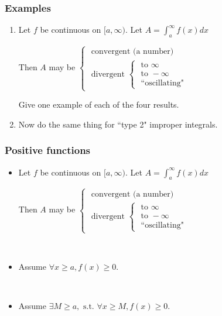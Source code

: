 \documentclass[14pt]{beamer}
\begin{document}
\begin{frame}[t]
	\frametitle{Examples}

	\begin{enumerate}
		\item Let $f$ be continuous on $[a, \infty)$. Let
			$\displaystyle A = \int_{a}^{\infty}f(x) dx$

			Then $A$ may be $\displaystyle
			\begin{cases}
				\text{ convergent (a number) }                                                                                  \\
				\text{ divergent } \begin{cases}\text{ to } \infty \\ \text{ to } - \infty \\ \text{ ``oscillating"}\end{cases}
			\end{cases}$

			Give one example of each of the four results.
			\vfill

		\item Now do the same thing for ``type 2" improper integrals.
	\end{enumerate}
	\vfill
\end{frame}

\begin{frame}[t]
	\fontsize{13}{13}\selectfont
	\frametitle{Positive functions}

	\begin{itemize}
		\item Let $f$ be continuous on $[a, \infty)$. Let
			$\displaystyle A = \int_{a}^{\infty}f(x) dx$

			Then $A$ may be $\displaystyle
			\begin{cases}
				\text{ convergent (a number) }                                                                                  \\
				\text{ divergent } \begin{cases}\text{ to } \infty \\ \text{ to } - \infty \\ \text{ ``oscillating"}\end{cases}
			\end{cases}$

			\

		\item Assume $\displaystyle \forall x \geq a, f(x) \geq 0$.
			\vspace{.2cm}


			\

		\item Assume $\displaystyle \exists M \geq a, \text{ s.t. }\forall x \geq M,
			f(x) \geq 0$.
			\vspace{.2cm}

	\end{itemize}
\end{frame}
\end{document}
